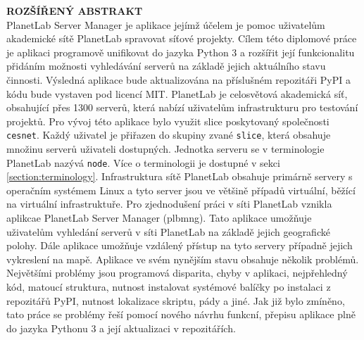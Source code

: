 \documentclass[%
  12pt,       				%
  a4paper,    				%
	unicode,						%
]{report}				    	%
\begin{document}
\cleardoublepage
\noindent
{\large\sffamily\bfseries\MakeUppercase{Rozšířený abstrakt}}
\\
PlanetLab Server Manager je aplikace jejímž účelem je pomoc uživatelům akademické sítě PlanetLab spravovat síťové projekty. Cílem této diplomové práce je aplikaci programově unifikovat do jazyka Python 3 a rozšířit její funkcionalitu přidáním možnosti vyhledávání serverů na základě jejich aktuálního stavu činnosti. Výsledná aplikace bude aktualizována na příslušném repozitáři PyPI a kódu bude vystaven pod licencí MIT. PlanetLab je celosvětová akademická síť, obsahující přes 1300 serverů, která nabízí uživatelům infrastrukturu pro testování projektů. Pro vývoj této aplikace bylo využit slice poskytovaný společnosti \texttt{cesnet}. Každý uživatel je přiřazen do skupiny zvané \texttt{slice}, která obsahuje množinu serverů uživateli dostupných. Jednotka serveru se v terminologie PlanetLab nazývá \texttt{node}. Více o terminologii je dostupné v sekci \ref{section:terminology}. Infrastruktura sítě PlanetLab obsahuje primárně servery s operačním systémem Linux a tyto server jsou ve většině případů virtuální, běžící na virtuální infrastruktuře. Pro zjednodušení práci v síti PlanetLab vznikla aplikcae PlanetLab Server Manager (plbmng). Tato aplikace umožňuje uživatelům vyhledání serverů v síti PlanetLab na základě jejich geografické polohy. Dále aplikace umožňuje vzdálený přístup na tyto servery případně jejich vykreslení na mapě. Aplikace ve svém nynějším stavu obsahuje několik problémů. Největšími problémy jsou programová disparita, chyby v aplikaci, nejpřehledný kód, matoucí struktura, nutnost instalovat systémové balíčky po instalaci z repozitářů PyPI, nutnost lokalizace skriptu, pády a jiné. Jak již bylo zmíněno, tato práce se problémy řeší pomocí nového návrhu funkcní, přepisu aplikace plně do jazyka Pythonu 3 a její aktualizaci v repozitářích.
\end{document}
